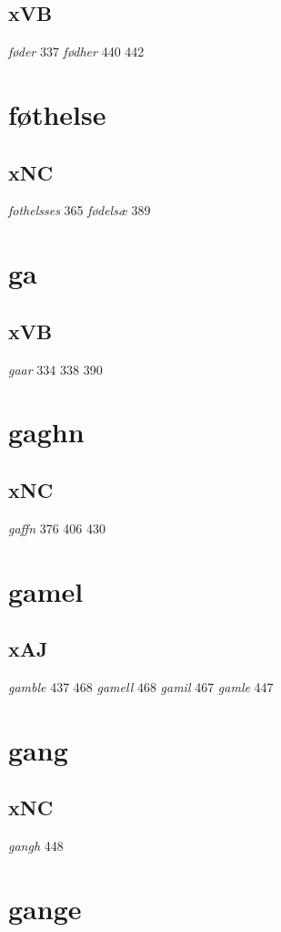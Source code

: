 \documentclass[a4paper,twocolumn]{article}
\begin{document}
\subsection{xVB}
\label{sec:org8bbcdfa}
\emph{føder} 337 \emph{fødher} 440 442 
\section{føthelse}
\label{sec:org2a50778}
\subsection{xNC}
\label{sec:org7fc3c30}
\emph{fothelsses} 365 \emph{fødelsæ} 389 
\section{ga}
\label{sec:orgeac026a}
\subsection{xVB}
\label{sec:org3bc2495}
\emph{gaar} 334 338 390 
\section{gaghn}
\label{sec:org6272690}
\subsection{xNC}
\label{sec:org8aaa264}
\emph{gaffn} 376 406 430 
\section{gamel}
\label{sec:org0228491}
\subsection{xAJ}
\label{sec:org5b18867}
\emph{gamble} 437 468 \emph{gamell} 468 \emph{gamil} 467 \emph{gamle} 447 
\section{gang}
\label{sec:org38f1131}
\subsection{xNC}
\label{sec:org37adbeb}
\emph{gangh} 448 
\section{gange}
\label{sec:orgb4d157f}
\end{document}
